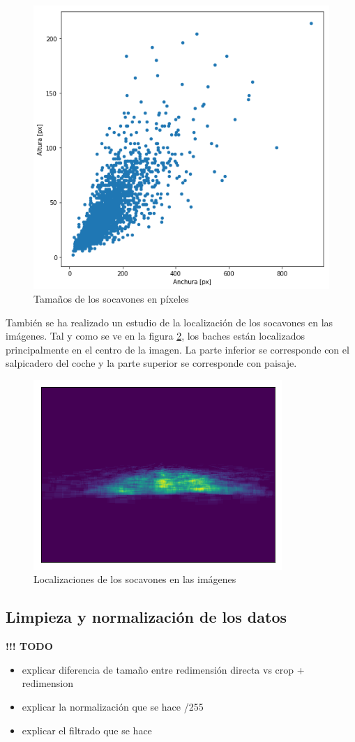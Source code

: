 \begin{figure}[H]
	\centering
	\includegraphics[width=0.8\linewidth]{images/pothole_sizes_scatter_plot.png}
	\caption{Tamaños de los socavones en píxeles}
	\label{fig:potholesizes}
\end{figure}

También se ha realizado un estudio de la localización de los socavones en las imágenes. Tal y como se ve en la figura \ref{fig:potholeslocations}, los baches están localizados principalmente en el centro de la imagen. La parte inferior se corresponde con el salpicadero del coche y la parte superior se corresponde con paisaje.

\begin{figure}[H]
	\centering
	\includegraphics[width=0.8\linewidth]{images/pothole_locations_heatmap.png}
	\caption{Localizaciones de los socavones en las imágenes}
	\label{fig:potholeslocations}
\end{figure}

\subsection{Limpieza y normalización de los datos}

\textbf{!!! TODO}
\begin{itemize}
	\item explicar diferencia de tamaño entre redimensión directa vs crop + redimension
	\item explicar la normalización que se hace /255
	\item explicar el filtrado que se hace
\end{itemize}